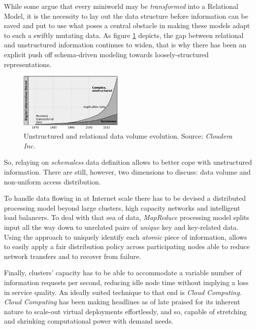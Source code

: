 \documentclass{sig-alternate}
\begin{document}
While some argue that every miniworld may be \emph{transformed} into a Relational Model, it is the necessity to lay out the data structure before information can be saved and put to use what poses a central obstacle in making these models adapt to such a swiftly mutating data. As figure \ref{fig:trend} depicts, the gap between relational and unstructured information continues to widen, that is why there has been an explicit push off schema-driven modeling towards loosely-structured representations.

\begin{figure}[tbp]
\centering
\includegraphics[width=0.45\textwidth]{img/001}
\caption{Unstructured and relational data volume evolution. Source: \emph{Cloudera Inc.}}
\label{fig:trend}
\end{figure}

So, relaying on \emph{schemaless} data definition allows to better cope with unstructured information. There are still, however, two dimensions to discuss: data volume and non-uniform access distribution.

To handle data flowing in at Internet scale there has to be devised a distributed processing model beyond large clusters, high capacity networks and intelligent load balancers. To deal with that sea of data, \emph{MapReduce} processing model splits input all the way down to unrelated pairs of \emph{unique} key and key-related data. Using the approach to uniquely identify each \emph{atomic} piece of information, allows to easily apply a fair distribution policy across participating nodes able to reduce network transfers and to recover from failure.

Finally, clusters' capacity has to be able to accommodate a variable number of information requests per second, reducing idle node time without implying a loss in service quality. An ideally suited technique to that end is \emph{Cloud Computing}. \emph{Cloud Computing} has been making headlines as of late praised for its inherent nature to scale-out virtual deployments effortlessly, and so, capable of stretching and shrinking computational power with demand needs.
\end{document}
